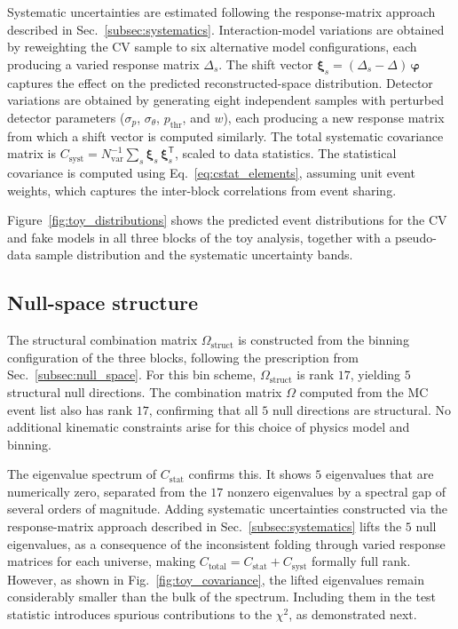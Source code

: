 \documentclass[a4paper,11pt]{article}
\begin{document}
Systematic uncertainties are estimated following the response-matrix approach described in Sec.~\ref{subsec:systematics}. Interaction-model variations are obtained by reweighting the CV sample to six alternative model configurations, each producing a varied response matrix $\Delta_{s}$. The shift vector $\boldsymbol{\xi}_{s} = (\Delta_{s} - \Delta) \, \boldsymbol{\varphi}$ captures the effect on the predicted reconstructed-space distribution. Detector variations are obtained by generating eight independent samples with perturbed detector parameters ($\sigma_p$, $\sigma_\theta$,
$p_\text{thr}$, and $w$), each producing a new response matrix from which a shift vector is computed similarly. The total systematic covariance matrix is $C_\text{syst} = N_\text{var}^{-1} \sum_s \boldsymbol{\xi}_{s} \, \boldsymbol{\xi}_{s}^\mathsf{T}$, scaled to data statistics. The statistical covariance is computed using Eq.~\eqref{eq:cstat_elements}, assuming unit event weights, which captures the inter-block correlations from event sharing.

Figure~\ref{fig:toy_distributions} shows the predicted event distributions for the CV and fake models in all three blocks of the toy analysis, together with a pseudo-data sample distribution and the systematic uncertainty bands.

\subsection{Null-space structure}

The structural combination matrix $\Omega_{\text{struct}}$ is constructed from the binning configuration of the three blocks, following the prescription from Sec.~\ref{subsec:null_space}. For this bin scheme, $\Omega_{\text{struct}}$ is rank $17$, yielding $5$ structural null directions. The combination matrix $\Omega$ computed from the MC event list also has rank $17$, confirming that all $5$ null directions are structural. No additional kinematic constraints arise for this choice of physics model and binning.

The eigenvalue spectrum of $C_{\text{stat}}$ confirms this. It shows $5$ eigenvalues that are numerically zero, separated from the $17$ nonzero eigenvalues by a spectral gap of several orders of magnitude. Adding systematic uncertainties constructed via the response-matrix approach described in Sec.~\ref{subsec:systematics} lifts the $5$ null eigenvalues, as a consequence of the inconsistent folding through varied response matrices for each universe, making $C_\text{total} = C_\text{stat} + C_\text{syst}$ formally full rank. However, as shown in Fig.~\ref{fig:toy_covariance}, the lifted eigenvalues remain considerably smaller than the bulk of the spectrum. Including them in the test statistic introduces spurious contributions to the $\chi^{2}$, as demonstrated next. 
\end{document}
